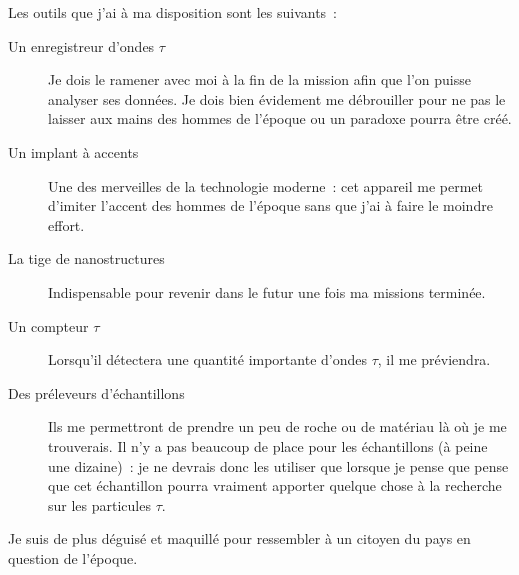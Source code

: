 {	Les outils que j’ai à ma disposition sont les suivants~:
	\begin{description}
		\item[Un enregistreur d’ondes $\tau$]  Je dois le ramener avec moi à la fin de la mission afin que l’on puisse analyser ses données.
			Je dois bien évidement me débrouiller pour ne pas le laisser aux mains des hommes de l’époque ou un paradoxe pourra être créé.
		\item[Un implant à accents]  Une des merveilles de la technologie moderne~:  cet appareil me permet d’imiter l’accent des hommes de l’époque sans que j’ai à faire le moindre effort.
		\item[La tige de nanostructures]  Indispensable pour revenir dans le futur une fois ma missions terminée.
		\item[Un compteur $\tau$]  Lorsqu’il détectera une quantité importante d’ondes $\tau$, il me préviendra.
		\item[Des préleveurs d’échantillons]  Ils me permettront de prendre un peu de roche ou de matériau là où je me trouverais.
			Il n’y a pas beaucoup de place pour les échantillons (à peine une dizaine)~:  je ne devrais donc les utiliser que lorsque je pense que pense que cet échantillon pourra vraiment apporter quelque chose à la recherche sur les particules $\tau$.
	\end{description}
	Je suis de plus déguisé et maquillé pour ressembler à un citoyen du pays en question de l’époque.
}

